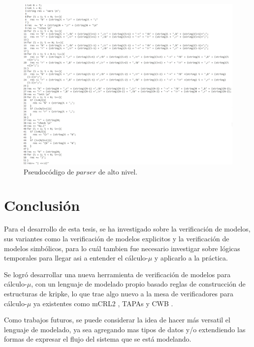 \begin{figure}[H]
  \centering
  \includegraphics[width=1.1\textwidth]{Figures/parser1.png}
  \caption{Pseudocódigo de $parser$ de alto nivel.}
  \label{fig:parser}
\end{figure}

\chapter*{Conclusión}

Para el desarrollo de esta tesis, se ha investigado sobre la verificación de modelos, sus variantes como la verificación de modelos explicitos y la verificación de modelos simbólicos, para lo cuál tambien fue necesario investigar sobre lógicas temporales para llegar asi a entender el cálculo-$\mu$ y aplicarlo a la práctica.

Se logró desarrollar una nueva herramienta de verificación de modelos para cálculo-$\mu$, con un lenguaje de modelado propio basado reglas de construcción de estructuras de kripke, lo que trae algo nuevo a la mesa de verificadores para cálculo-$\mu$ ya existentes como mCRL2 \cite{Groote:14}, TAPAs \cite{Calzolai:15} y CWB \cite{Moller:13}.

Como trabajos futuros, se puede considerar la idea de hacer más versatil el lenguaje de modelado, ya sea agregando mas tipos de datos y/o extendiendo las formas de expresar el flujo del sistema que se está modelando.